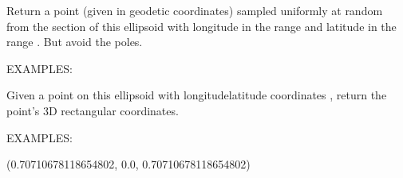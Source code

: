 \documentclass[a4paper,12ptopenany,oneside,english]{sphinxmanual}
\begin{document}
\begin{fulllineitems}
\begin{fulllineitems}
\label{\detokenize{ellipsoids:rhealpixdggs.ellipsoids.Ellipsoid.random_point}}
\pysigstartsignatures
{}
\pysigstopsignatures
\sphinxAtStartPar
Return a point (given in geodetic coordinates) sampled uniformly at
random from the section of this ellipsoid with longitude in the range
 and latitude in the range
.
But avoid the poles.

\sphinxAtStartPar
EXAMPLES:

\begin{sphinxVerbatim}[commandchars=\\\{\}]
  
\end{sphinxVerbatim}

\end{fulllineitems}


\begin{fulllineitems}
\label{\detokenize{ellipsoids:rhealpixdggs.ellipsoids.Ellipsoid.xyz}}
\pysigstartsignatures
{}
\pysigstopsignatures
\sphinxAtStartPar
Given a point on this ellipsoid with longitude\sphinxhyphen{}latitude coordinates
, return the point’s 3D rectangular coordinates.

\sphinxAtStartPar
EXAMPLES:

\begin{sphinxVerbatim}[commandchars=\\\{\}]
  
  
\end{sphinxVerbatim}
\begin{description}
\sphinxAtStartPar
(0.70710678118654802, 0.0, 0.70710678118654802)


\end{description}
\end{fulllineitems}
\end{fulllineitems}
\end{document}

